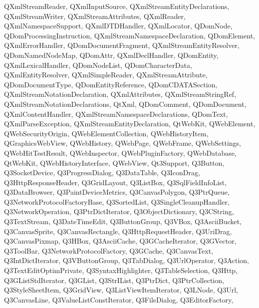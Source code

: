 {{    QXmlStreamReader,%
    QXmlInputSource,%
    QXmlStreamEntityDeclarations,%
    QXmlStreamWriter,%
    QXmlStreamAttributes,%
    QXmlReader,%
    QXmlNamespaceSupport,%
    QXmlDTDHandler,%
    QXmlLocator,%
    QDomNode,%
    QDomProcessingInstruction,%
    QXmlStreamNamespaceDeclaration,%
    QDomElement,%
    QXmlErrorHandler,%
    QDomDocumentFragment,%
    QXmlStreamEntityResolver,%
    QDomNamedNodeMap,%
    QDomAttr,%
    QXmlDeclHandler,%
    QDomEntity,%
    QXmlLexicalHandler,%
    QDomNodeList,%
    QDomCharacterData,%
    QXmlEntityResolver,%
    QXmlSimpleReader,%
    QXmlStreamAttribute,%
    QDomDocumentType,%
    QDomEntityReference,%
    QDomCDATASection,%
    QXmlStreamNotationDeclaration,%
    QXmlAttributes,%
    QXmlStreamStringRef,%
    QXmlStreamNotationDeclarations,%
    QtXml,%
    QDomComment,%
    QDomDocument,%
    QXmlContentHandler,%
    QXmlStreamNamespaceDeclarations,%
    QDomText,%
    QXmlParseException,%
    QXmlStreamEntityDeclaration,%
    QtWebKit,%
    QWebElement,%
    QWebSecurityOrigin,%
    QWebElementCollection,%
    QWebHistoryItem,%
    QGraphicsWebView,%
    QWebHistory,%
    QWebPage,%
    QWebFrame,%
    QWebSettings,%
    QWebHitTestResult,%
    QWebInspector,%
    QWebPluginFactory,%
    QWebDatabase,%
    QtWebKit,%
    QWebHistoryInterface,%
    QWebView,%
    Qt3Support,%
    Q3Button,%
    Q3SocketDevice,%
    Q3ProgressDialog,%
    Q3DataTable,%
    Q3IconDrag,%
    Q3HttpResponseHeader,%
    Q3GridLayout,%
    Q3ListBox,%
    Q3SqlFieldInfoList,%
    Q3DataBrowser,%
    Q3PaintDeviceMetrics,%
    Q3CanvasPolygon,%
    Q3PtrQueue,%
    Q3NetworkProtocolFactoryBase,%
    Q3SortedList,%
    Q3SingleCleanupHandler,%
    Q3NetworkOperation,%
    Q3PtrDictIterator,%
    Q3ObjectDictionary,%
    Q3CString,%
    Q3TextStream,%
    Q3DateTimeEdit,%
    Q3ButtonGroup,%
    Q3VBox,%
    Q3AsciiBucket,%
    Q3CanvasSprite,%
    Q3CanvasRectangle,%
    Q3HttpRequestHeader,%
    Q3UriDrag,%
    Q3CanvasPixmap,%
    Q3HBox,%
    Q3AsciiCache,%
    Q3GCacheIterator,%
    Q3GVector,%
    Q3ToolBar,%
    Q3NetworkProtocolFactory,%
    Q3GCache,%
    Q3CanvasText,%
    Q3IntDictIterator,%
    Q3VButtonGroup,%
    Q3TabDialog,%
    Q3UrlOperator,%
    Q3Action,%
    Q3TextEditOptimPrivate,%
    Q3SyntaxHighlighter,%
    Q3TableSelection,%
    Q3Http,%
    Q3GListStdIterator,%
    Q3GList,%
    Q3StrIList,%
    Q3PtrDict,%
    Q3PtrCollection,%
    Q3StyleSheetItem,%
    Q3GridView,%
    Q3ListViewItemIterator,%
    Q3LNode,%
    Q3Url,%
    Q3CanvasLine,%
    Q3ValueListConstIterator,%
    Q3FileDialog,%
    Q3EditorFactory,%
}}
